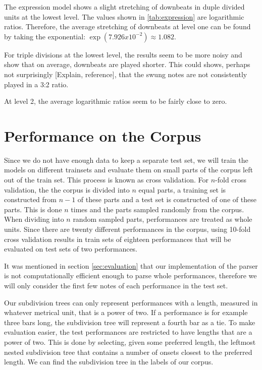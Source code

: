 The expression model shows a slight stretching of downbeats in duple divided units at the lowest level. The values shown in \ref{tab:expression} are logarithmic ratios. Therefore, the average stretching of downbeats at level one can be found by taking the exponential: $\exp(7.926 x 10^{-2}) \approx 1.082$. 

For triple divisions at the lowest level, the results seem to be more noisy and show that on average, downbeats are played shorter. This could shows, perhaps not surprisingly [Explain, reference], that the swung notes are not consistently played in a 3:2 ratio.

At level 2, the average logarithmic ratios seem to be fairly close to zero.

\section{Performance on the Corpus}

Since we do not have enough data to keep a separate test set, we will train the models on different trainsets and evaluate them on small parts of the corpus left out of the train set. This process is known as cross validation. For $n$-fold cross validation, the the corpus is divided into $n$ equal parts, a training set is constructed from $n-1$ of these parts and a test set is constructed of one of these parts. This is done $n$ times and the parts sampled randomly from the corpus. When dividing into $n$ random sampled parts, performances are treated as whole units. Since there are twenty different performances in the corpus, using 10-fold cross validation results in train sets of eighteen performances that will be evaluated on test sets of two performances.

It was mentioned in section \ref{sec:evaluation} that our implementation of the parser is not computationally efficient enough to parse whole performances, therefore we will only consider the first few notes of each performance in the test set. 

Our subdivision trees can only represent performances with a length, measured in whatever metrical unit, that is a power of two. If a performance is for example three bars long, the subdivision tree will represent a fourth bar as a tie. To make evaluation easier, the test performances are restricted to have lengths that are a power of two. This is done by selecting, given some preferred length, the leftmost nested subdivision tree that contains a number of onsets closest to the preferred length. We can find the subdivision tree in the labels of our corpus.

